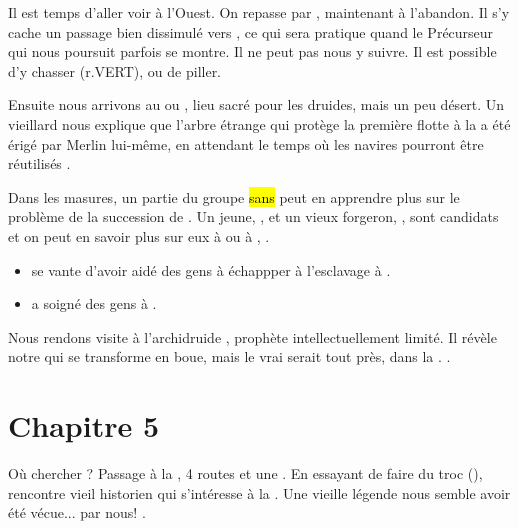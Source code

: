 \documentclass[11pt]{article}
\begin{document}
Il est temps d'aller voir à l'Ouest. On repasse par \falfuar{}, maintenant à l'abandon. Il s'y cache un passage bien dissimulé vers \tordracine{} \nrj[-2], ce qui sera pratique quand le Précurseur qui nous poursuit parfois se montre. Il ne peut pas nous y suivre. Il est possible d'y chasser (r.VERT), ou de piller.

Ensuite nous arrivons au \cerclelunaire{}  ou , lieu sacré pour les druides, mais un peu désert. Un vieillard nous explique que l'arbre étrange qui protège la première flotte à la \flotte{} a été érigé par Merlin lui-même, en attendant le temps où les navires pourront être réutilisés .


Dans les masures, un partie du groupe \hl{sans \larve{}} peut en apprendre plus sur le problème de la succession de \geraint{}. Un jeune, \breagach{}, et un vieux forgeron, \morfran{}, sont candidats et on peut en savoir plus sur eux à \broch{} ou à \blanc{}, .

\begin{itemize}
\item \morfran{} se vante d'avoir aidé des gens à échappper à l'esclavage à \broch{}.
\item \breagach{} a soigné des gens à \blanc{}.
\end{itemize}


Nous rendons visite à l'archidruide \amergin{}, prophète intellectuellement limité. Il révèle notre \fauxgraal{} qui se transforme en boue, mais le vrai serait tout près, dans la \adiante{}. .

\section{Chapitre 5}

Où chercher ? Passage à la \croisee{}, 4 routes et une \pierrerancune{}. En essayant de faire du troc (\nrj[-1]), rencontre vieil historien  qui s'intéresse à la \pierrerancune{}. Une vieille légende nous semble avoir été vécue... par nous! .
\end{document}
